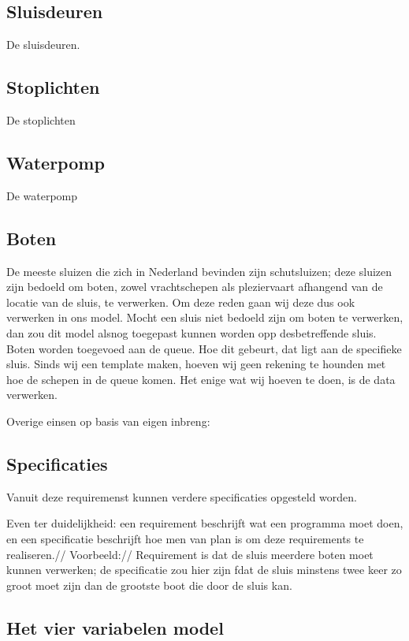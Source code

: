 \documentclass{article}
\begin{document}
	\subsection{Sluisdeuren}
	De sluisdeuren.
	
	\subsection{Stoplichten}
	De stoplichten
	
	\subsection{Waterpomp}
	De waterpomp
	
	\subsection{Boten}
	De meeste sluizen die zich in Nederland bevinden zijn schutsluizen; deze sluizen zijn bedoeld om boten, zowel vrachtschepen als pleziervaart afhangend van de locatie van de sluis, te verwerken. Om deze reden gaan wij deze dus ook verwerken in ons model. Mocht een sluis niet bedoeld zijn om boten te verwerken, dan zou dit model alsnog toegepast kunnen worden opp desbetreffende sluis.
	Boten worden toegevoed aan de queue. Hoe dit gebeurt, dat ligt aan de specifieke sluis.  Sinds wij een template maken, hoeven wij geen rekening te hounden met hoe de schepen in de queue komen. Het enige wat wij hoeven te doen, is de data verwerken.
	
	Overige einsen op basis van eigen inbreng:\\
	
	
	
	\subsection{Specificaties}
	Vanuit deze requiremenst kunnen verdere specificaties opgesteld worden.
	
	Even ter duidelijkheid: een requirement beschrijft wat een programma moet doen, en een specificatie beschrijft hoe men van plan is om deze requirements te realiseren.//
	Voorbeeld:// Requirement is dat de sluis meerdere boten moet kunnen verwerken; de specificatie zou hier zijn fdat de sluis minstens twee keer zo groot moet zijn dan de grootste boot die door de sluis kan.
	
	\subsection{Het vier variabelen model}
\end{document}

